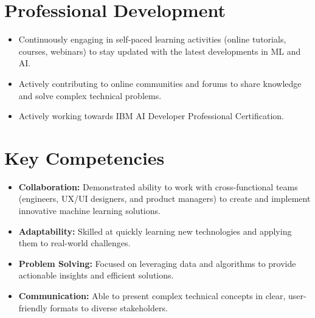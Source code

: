 \documentclass[a4paper,10pt]{moderncv}
\begin{document}
\section{Professional Development}
\begin{itemize}
    \item Continuously engaging in self-paced learning activities (online tutorials, courses, webinars) to stay updated with the latest developments in ML and AI.
    \item Actively contributing to online communities and forums to share knowledge and solve complex technical problems.
    \item Actively working towards IBM AI Developer Professional Certification.
\end{itemize}

\section{Key Competencies}
\begin{itemize}
    \item \textbf{Collaboration:} Demonstrated ability to work with cross-functional teams (engineers, UX/UI designers, and product managers) to create and implement innovative machine learning solutions.
    \item \textbf{Adaptability:} Skilled at quickly learning new technologies and applying them to real-world challenges.
    \item \textbf{Problem Solving:} Focused on leveraging data and algorithms to provide actionable insights and efficient solutions.
    \item \textbf{Communication:} Able to present complex technical concepts in clear, user-friendly formats to diverse stakeholders.
\end{itemize}
\end{document}
